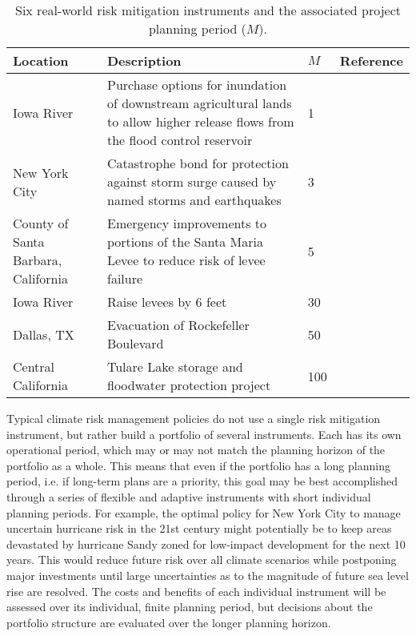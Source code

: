 \documentclass[
  draft,
  linenumbers
]{agujournal2019}
\begin{document}
\noindent\begin{table}
  {\footnotesize
    \begin{tabular}{L{1in}L{2.5in}L{0.3in}L{1.7in}}
      \toprule
      Location & Description & $M$ & Reference \\
      \midrule
      Iowa River & Purchase options for inundation of downstream agricultural lands to allow higher release flows from the flood control reservoir & 1 & \citet{Spence:2016ca} \\
      New York City & Catastrophe bond for protection against storm surge caused by named storms and earthquakes & 3 &  \\
      County of Santa Barbara, California & Emergency improvements to portions of the Santa Maria Levee to reduce risk of levee failure & 5 & \citet{USACE:2007ta} \\
      Iowa River & Raise levees by 6 feet & 30 & \citet{Spence:2016ca} \\
      Dallas, TX & Evacuation of Rockefeller Boulevard & 50 & \citet{USACE:2014vn} \\
      Central California & Tulare Lake storage and floodwater protection project & 100 & \citet{GEI:gIaEZ-gS} \\
      \bottomrule
    \end{tabular}
    \caption{
      Six real-world risk mitigation instruments and the associated project planning period ($M$).
    }\label{tab:real-world-M}
  }
\end{table}

Typical climate risk management policies do not use a single risk mitigation instrument, but rather build a portfolio of several instruments.
Each has its own operational period, which may or may not match the planning horizon of the portfolio as a whole.
This means that even if the portfolio has a long planning period, i.e.\@\xspace if long-term plans are a priority, this goal may be best accomplished through a series of flexible and adaptive instruments with short individual planning periods.
For example, the optimal policy for New York City to manage uncertain hurricane risk in the 21st century might potentially be to keep areas devastated by hurricane Sandy zoned for low-impact development for the next 10 years.
This would reduce future risk over all climate scenarios while postponing major investments until large uncertainties as to the magnitude of future sea level rise are resolved.
The costs and benefits of each individual instrument will be assessed over its individual, finite planning period, but decisions about the portfolio structure are evaluated over the longer planning horizon.
\end{document}
